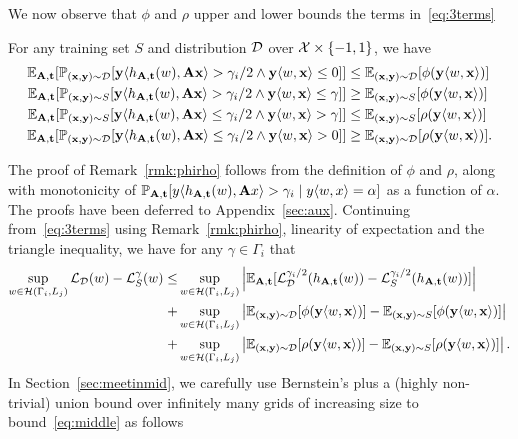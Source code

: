 We now observe that $\phi$ and $\rho$ upper and lower bounds the terms in~\eqref{eq:3terms}
\begin{remark}
\label{rmk:phirho}
For any training set $S$ and distribution $\mathcal{D}$ over $\mathcal{X} \times \{-1,1\}$, we have
\begin{align*}
    \mathbb{E}_{\mathbf{A},\mathbf{t}} [\mathbb{P}_{(\mathbf{x},\mathbf{y}) \sim \mathcal{D}}[\mathbf{y} \langle h_{\mathbf{A},\mathbf{t}}(w), \mathbf{A} \mathbf{x}\rangle > \gamma_i/2 \wedge \mathbf{y} \langle w, \mathbf{x}\rangle \leq 0]] &\leq\mathbb{E}_{(\mathbf{x},\mathbf{y}) \sim \mathcal{D}}[\phi(\mathbf{y} \langle w, \mathbf{x} \rangle)] \\
    \mathbb{E}_{\mathbf{A},\mathbf{t}} [\mathbb{P}_{(\mathbf{x},\mathbf{y}) \sim S}[\mathbf{y} \langle h_{\mathbf{A},\mathbf{t}}(w), \mathbf{A} \mathbf{x}\rangle > \gamma_i/2 \wedge \mathbf{y} \langle w, \mathbf{x}\rangle \leq \gamma]] &\geq \mathbb{E}_{(\mathbf{x},\mathbf{y}) \sim S}[\phi(\mathbf{y} \langle w, \mathbf{x} \rangle)] \\
    \mathbb{E}_{\mathbf{A},\mathbf{t}} [\mathbb{P}_{(\mathbf{x},\mathbf{y}) \sim S}[\mathbf{y} \langle h_{\mathbf{A},\mathbf{t}}(w), \mathbf{A} \mathbf{x}\rangle \leq \gamma_i/2 \wedge \mathbf{y} \langle w, \mathbf{x}\rangle > \gamma]] &\leq \mathbb{E}_{(\mathbf{x}, \mathbf{y}) \sim S}[\rho(\mathbf{y} \langle w, \mathbf{x} \rangle)]\\
    \mathbb{E}_{\mathbf{A},\mathbf{t}} [\mathbb{P}_{(\mathbf{x},\mathbf{y}) \sim \mathcal{D}}[\mathbf{y} \langle h_{\mathbf{A},\mathbf{t}}(w), \mathbf{A} \mathbf{x}\rangle \leq \gamma_i/2 \wedge \mathbf{y} \langle w, \mathbf{x}\rangle > 0]] &\geq \mathbb{E}_{(\mathbf{x}, \mathbf{y}) \sim \mathcal{D}}[\rho(\mathbf{y}\langle w, \mathbf{x} \rangle)].
\end{align*}
\end{remark}
The proof of Remark~\ref{rmk:phirho} follows from the definition of $\phi$ and $\rho$, along with monotonicity of $\mathbb{P}_{\mathbf{A},\mathbf{t}}[y \langle h_{\mathbf{A},\mathbf{t}}(w),\mathbf{A} x\rangle > \gamma_i \mid y\langle w,x\rangle=\alpha]$ as a function of $\alpha$. The proofs have been deferred to Appendix~\ref{sec:aux}.
Continuing from~\eqref{eq:3terms} using Remark~\ref{rmk:phirho}, linearity of expectation and the triangle inequality, we have for any $\gamma \in \Gamma_i$ that
\begin{align}
\sup_{w \in \mathcal{H}(\Gamma_i, L_j)} \mathcal{L}_{\mathcal{D}}(w) - \mathcal{L}^\gamma_S(w) \leq&
\sup_{w \in \mathcal{H}(\Gamma_i, L_j)} \left|\mathbb{E}_{\mathbf{A},\mathbf{t}} [\mathcal{L}^{\gamma_i/2}_{\mathcal{D}}(h_{\mathbf{A},\mathbf{t}}(w)) - \mathcal{L}^{\gamma_i/2}_S(h_{\mathbf{A},\mathbf{t}}(w))]\right| \label{eq:middle}\\
+&\sup_{w \in \mathcal{H}(\Gamma_i, L_j)} \left| \mathbb{E}_{(\mathbf{x},\mathbf{y}) \sim \mathcal{D}}[\phi(\mathbf{y} \langle w, \mathbf{x} \rangle)] -\mathbb{E}_{(\mathbf{x},\mathbf{y}) \sim S}[\phi(\mathbf{y} \langle w, \mathbf{x} \rangle)]\right| \label{eq:phi}\\
+&\sup_{w \in \mathcal{H}(\Gamma_i, L_j)} \left|\mathbb{E}_{(\mathbf{x},\mathbf{y}) \sim \mathcal{D}}[\rho(\mathbf{y} \langle w, \mathbf{x} \rangle)] -\mathbb{E}_{(\mathbf{x},\mathbf{y}) \sim S}[\rho(\mathbf{y} \langle w, \mathbf{x} \rangle)] \right|.\label{eq:rho}
\end{align}
In Section~\ref{sec:meetinmid}, we carefully use Bernstein's plus a (highly non-trivial) union bound over infinitely many grids of increasing size to bound~\eqref{eq:middle} as follows
